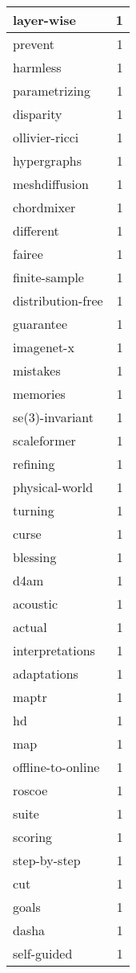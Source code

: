 \begin{table}[h]
\begin{tabular}{|l|r|}
\hline
layer-wise & 1 \\
\hline
prevent & 1 \\
\hline
harmless & 1 \\
\hline
parametrizing & 1 \\
\hline
disparity & 1 \\
\hline
ollivier-ricci & 1 \\
\hline
hypergraphs & 1 \\
\hline
meshdiffusion & 1 \\
\hline
chordmixer & 1 \\
\hline
different & 1 \\
\hline
fairee & 1 \\
\hline
finite-sample & 1 \\
\hline
distribution-free & 1 \\
\hline
guarantee & 1 \\
\hline
imagenet-x & 1 \\
\hline
mistakes & 1 \\
\hline
memories & 1 \\
\hline
se(3)-invariant & 1 \\
\hline
scaleformer & 1 \\
\hline
refining & 1 \\
\hline
physical-world & 1 \\
\hline
turning & 1 \\
\hline
curse & 1 \\
\hline
blessing & 1 \\
\hline
d4am & 1 \\
\hline
acoustic & 1 \\
\hline
actual & 1 \\
\hline
interpretations & 1 \\
\hline
adaptations & 1 \\
\hline
maptr & 1 \\
\hline
hd & 1 \\
\hline
map & 1 \\
\hline
offline-to-online & 1 \\
\hline
roscoe & 1 \\
\hline
suite & 1 \\
\hline
scoring & 1 \\
\hline
step-by-step & 1 \\
\hline
cut & 1 \\
\hline
goals & 1 \\
\hline
dasha & 1 \\
\hline
self-guided & 1 \\

\end{tabular}
\end{table}
